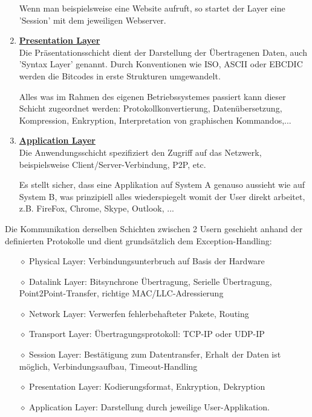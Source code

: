 \documentclass[11pt]{article}
\begin{document}
\begin{enumerate}
        Wenn man beispielsweise eine Website aufruft, so startet der Layer eine 'Session' mit dem jeweiligen Webserver.

        \item \textbf{\underline{Presentation Layer}}\\
        Die Präsentationsschicht dient der Darstellung der Übertragenen Daten, auch 'Syntax Layer' genannt.
        Durch Konventionen wie ISO, ASCII oder EBCDIC werden die Bitcodes in erste Strukturen umgewandelt.

        Alles was im Rahmen des eigenen Betriebssystemes passiert kann dieser Schicht zugeordnet werden: Protokollkonvertierung,
        Datenübersetzung, Kompression, Enkryption, Interpretation von graphischen Kommandos,...

        \item \textbf{\underline{Application Layer}}\\
        Die Anwendungsschicht spezifiziert den Zugriff auf das Netzwerk, beispielsweise Client/Server-Verbindung, P2P, etc.

        Es stellt sicher, dass eine Applikation auf System A genauso aussieht wie auf System B, was
        prinzipiell alles wiederspiegelt womit der User direkt arbeitet, z.B. FireFox, Chrome, Skype, Outlook, ...\\

    \end{enumerate}

    Die Kommunikation derselben Schichten zwischen 2 Usern geschieht anhand der definierten Protokolle und dient grundsätzlich dem Exception-Handling:
\begin{itemize}
    \item[$\diamond$] Physical Layer: Verbindungsunterbruch auf Basis der Hardware
    \item[$\diamond$] Datalink Layer: Bitsynchrone Übertragung, Serielle Übertragung, Point2Point-Transfer, richtige MAC/LLC-Adressierung
    \item[$\diamond$] Network Layer: Verwerfen fehlerbehafteter Pakete, Routing
    \item[$\diamond$] Transport Layer: Übertragungsprotokoll: TCP-IP oder UDP-IP
    \item[$\diamond$] Session Layer: Bestätigung zum Datentransfer, Erhalt der Daten ist möglich, Verbindungsaufbau, Timeout-Handling
    \item[$\diamond$] Presentation Layer: Kodierungsformat, Enkryption, Dekryption
    \item[$\diamond$] Application Layer: Darstellung durch jeweilige User-Applikation.
\end{itemize}
\end{document}
